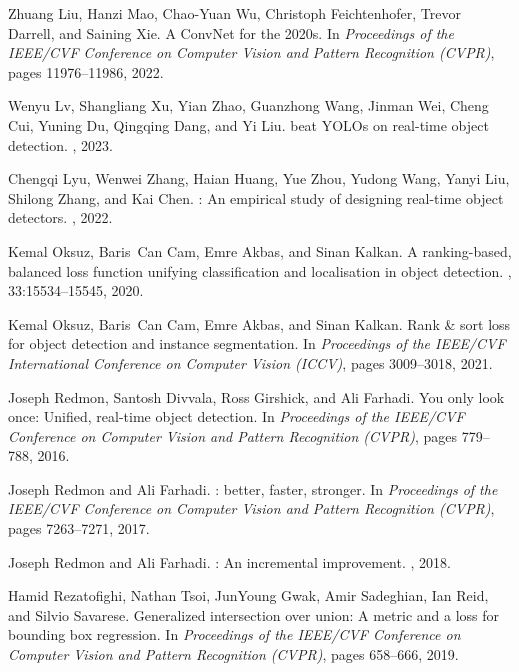 \documentclass[10pt,twocolumn,letterpaper]{article}
\begin{document}
{\begin{thebibliography}{10}
		Zhuang Liu, Hanzi Mao, Chao-Yuan Wu, Christoph Feichtenhofer, Trevor Darrell,
		and Saining Xie.
		\newblock A {ConvNet} for the 2020s.
		\newblock In {\em Proceedings of the IEEE/CVF Conference on Computer Vision and
			Pattern Recognition (CVPR)}, pages 11976--11986, 2022.
		
		Wenyu Lv, Shangliang Xu, Yian Zhao, Guanzhong Wang, Jinman Wei, Cheng Cui,
		Yuning Du, Qingqing Dang, and Yi Liu.
		 beat {YOLOs} on real-time object detection.
		, 2023.
		
		Chengqi Lyu, Wenwei Zhang, Haian Huang, Yue Zhou, Yudong Wang, Yanyi Liu,
		Shilong Zhang, and Kai Chen.
		: An empirical study of designing real-time object detectors.
		, 2022.
		
		Kemal Oksuz, Baris~Can Cam, Emre Akbas, and Sinan Kalkan.
		\newblock A ranking-based, balanced loss function unifying classification and
		localisation in object detection.
		,
		33:15534--15545, 2020.
		
		Kemal Oksuz, Baris~Can Cam, Emre Akbas, and Sinan Kalkan.
		\newblock Rank \& sort loss for object detection and instance segmentation.
		\newblock In {\em Proceedings of the IEEE/CVF International Conference on
			Computer Vision (ICCV)}, pages 3009--3018, 2021.
		
		Joseph Redmon, Santosh Divvala, Ross Girshick, and Ali Farhadi.
		\newblock You only look once: Unified, real-time object detection.
		\newblock In {\em Proceedings of the IEEE/CVF Conference on Computer Vision and
			Pattern Recognition (CVPR)}, pages 779--788, 2016.
		
		Joseph Redmon and Ali Farhadi.
		: better, faster, stronger.
		\newblock In {\em Proceedings of the IEEE/CVF Conference on Computer Vision and
			Pattern Recognition (CVPR)}, pages 7263--7271, 2017.
		
		Joseph Redmon and Ali Farhadi.
		: An incremental improvement.
		, 2018.
		
		Hamid Rezatofighi, Nathan Tsoi, JunYoung Gwak, Amir Sadeghian, Ian Reid, and
		Silvio Savarese.
		\newblock Generalized intersection over union: A metric and a loss for bounding
		box regression.
		\newblock In {\em Proceedings of the IEEE/CVF Conference on Computer Vision and
			Pattern Recognition (CVPR)}, pages 658--666, 2019.
		

\end{thebibliography}}
\end{document}
